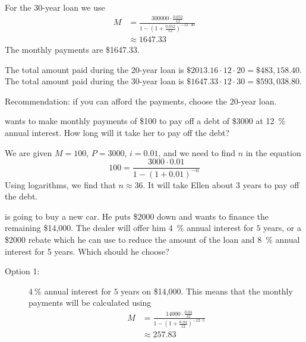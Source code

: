 \begin{problem}
\begin{subproblem}
\begin{shortsolution}
		For the $30$-year loan we use
		\begin{align*}
			M & = \frac{300000\cdot \frac{0.052}{12}}{1-\left( 1+\frac{0.052}{12} \right)^{-12\cdot 30}} \\ 
			  & \approx 1647.33                                                                          
		\end{align*}
		The monthly payments are \$1647.33.
				
		The total amount paid during the $20$-year loan is $\$2013.16\cdot 12\cdot 20=\$483,158.40$. 
		The total amount paid during the $30$-year loan is $\$1647.33\cdot 12\cdot 30=\$593,038.80$.
				
		Recommendation: if you can afford the payments, choose the $20$-year loan.
	\end{shortsolution}
\end{subproblem}
\begin{subproblem}
	 wants to make monthly payments of \$100 to pay off a debt of \$3000 
	at \SI{12}{\percent} annual interest. How long will it take her to pay off the 
	debt?
	\begin{shortsolution}
		We are given $M=100$, $P=3000$, $i=0.01$, and we need to find $n$
		in the equation
		\[
			100 = \frac{3000\cdot 0.01}{1-(1+0.01)^{-n}}
		\]
		Using logarithms, we find that $n\approx 36$. It will take 
		Ellen about $3$ years to pay off the debt.
	\end{shortsolution}
\end{subproblem}
\begin{subproblem}
	 is going to buy a new car. He puts \$2000 down and wants to finance the
	remaining \$14,000. The dealer will offer him \SI{4}{\percent} annual interest for 
	$5$ years, or a \$2000
	rebate which he can use to reduce the amount of the loan and \SI{8}{\percent} 
	annual interest for 5 years. Which should he choose?
	\begin{shortsolution}
		\begin{description}
			\item[Option 1:] $\SI{4}{\percent}$ annual interest for $5$ years on \$14,000.
			This means that the monthly payments will be calculated using
			\begin{align*}
				M & = \frac{14000\cdot \frac{0.04}{12}}{1-\left( 1+\frac{0.04}{12} \right)^{-12\cdot 5}} \\ 
				  & \approx 257.83                                                                       
			\end{align*}

\end{description}
\end{shortsolution}
\end{subproblem}
\end{problem}
